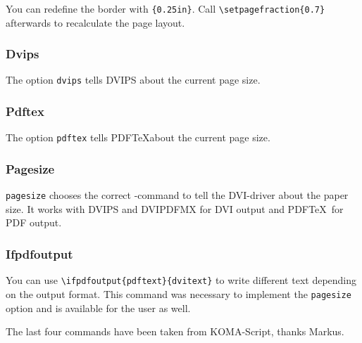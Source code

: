 You can redefine the border with 
\verb|{0.25in}|.
Call \verb|\setpagefraction{0.7}| afterwards to recalculate the page layout.

\subsubsection{Dvips}

The option \texttt{dvips} tells DVIPS about the current page size.

\subsubsection{Pdftex}

The option \texttt{pdftex} tells PDF\TeX about the current page size.

\subsubsection{Pagesize}

\texttt{pagesize} chooses the correct -command to tell the
DVI-driver about the paper size. It works with DVIPS and DVIPDFMX for DVI
output and PDF\TeX\ for PDF output.

\subsubsection{Ifpdfoutput}

You can use \verb|\ifpdfoutput{pdftext}{dvitext}| to write different text
depending on the output format. This command was necessary to implement the
\texttt{pagesize} option and is available for the user as well.

The last four commands have been taken from KOMA-Script, thanks Markus.

\endinput

